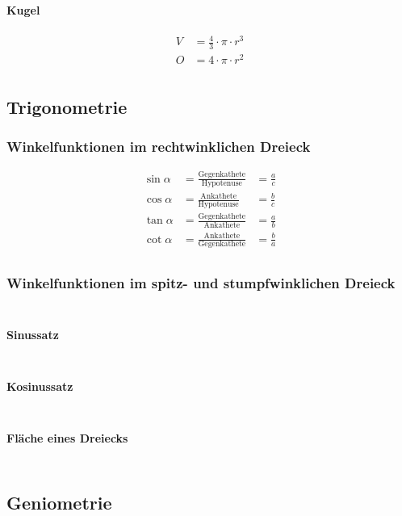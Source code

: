 \paragraph{Kugel}
\begin{align*}
    V &= \frac{4}{3} \cdot \pi \cdot r^3 \\
    O &= 4 \cdot \pi \cdot r^2 \\
\end{align*}

\subsection{Trigonometrie}
\subsubsection{Winkelfunktionen im rechtwinklichen Dreieck}
\begin{align*}
    \sin \alpha &= \frac{\textrm{Gegenkathete}}{\textrm{Hypotenuse}}  &= \frac{a}{c} \\
    \cos \alpha &= \frac{\textrm{Ankathete}}{\textrm{Hypotenuse}}     &= \frac{b}{c} \\
    \tan \alpha &= \frac{\textrm{Gegenkathete}}{\textrm{Ankathete}}   &= \frac{a}{b} \\
    \cot \alpha &= \frac{\textrm{Ankathete}}{\textrm{Gegenkathete}}   & = \frac{b}{a} \\
\end{align*}

\subsubsection{Winkelfunktionen im spitz- und stumpfwinklichen Dreieck}
\begin{align*}
\end{align*}

\paragraph{Sinussatz}
\begin{align*}
\end{align*}

\paragraph{Kosinussatz}
\begin{align*}
\end{align*}

\paragraph{Fläche eines Dreiecks}
\begin{align*}
\end{align*}


\subsection{Geniometrie}